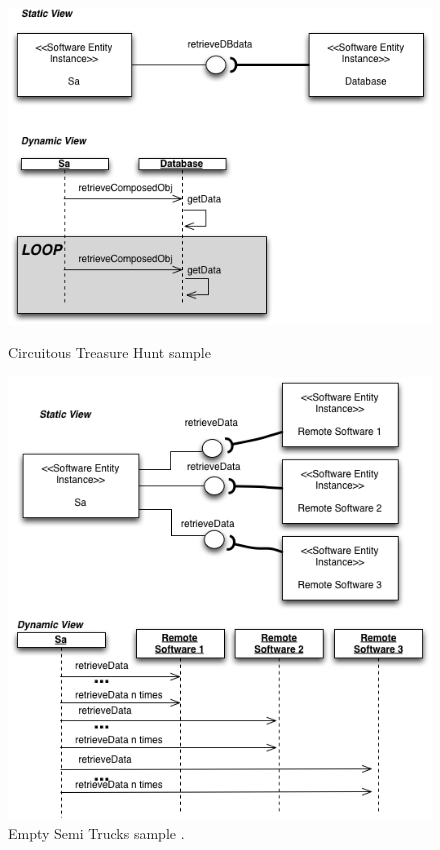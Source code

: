 \documentclass[times]{stvrauth}
\begin{document}
\begin{figure}[h]
\begin{minipage}{.5\textwidth}
\centering
\includegraphics[width=1\textwidth]{./images/circuit.png}
\caption{Circuitous
Treasure Hunt sample \cite{Vetoio2011}}
\label{fig:circuit}
\end{minipage}
\begin{minipage}{.5\textwidth}
\centering
\includegraphics[width=1\textwidth]{./images/trucks.png}
\caption{Empty Semi Trucks sample \cite{Vetoio2011}.}
\label{fig:trucks}
\end{minipage}
\end{figure}
\end{document}

